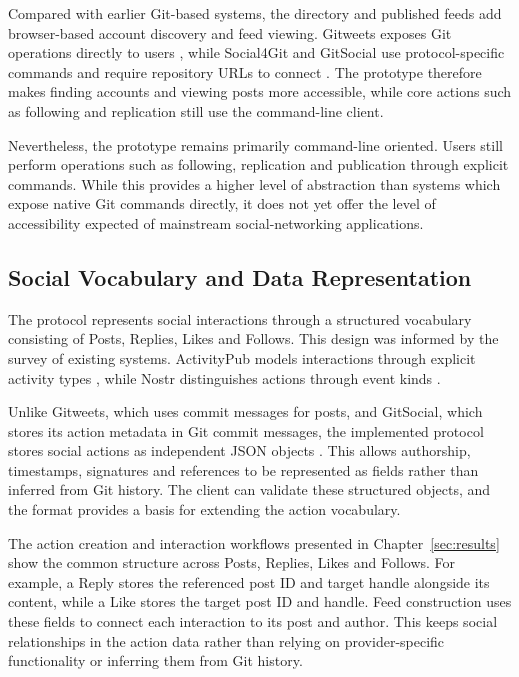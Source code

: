 Compared with earlier Git-based systems, the directory and published feeds
add browser-based account discovery and feed viewing. Gitweets exposes Git
operations directly to users \cite{gitweets2026}, while Social4Git and
GitSocial use protocol-specific commands and require repository URLs to
connect \cite{social4git2026,gitsocial2026}. The prototype therefore makes
finding accounts and viewing posts more accessible, while core actions such
as following and replication still use the command-line client.

Nevertheless, the prototype remains primarily command-line oriented.
Users still perform operations such as following, replication and
publication through explicit commands. While this provides a higher
level of abstraction than systems which expose native Git commands
directly, it does not yet offer the level of accessibility expected of
mainstream social-networking applications.

\subsection{Social Vocabulary and Data Representation}\label{sec:social-vocabulary-data}

The protocol represents social interactions through a structured
vocabulary consisting of Posts, Replies, Likes and Follows. This design
was informed by the survey of existing systems. ActivityPub models
interactions through explicit activity types \cite{w3cActivityPub2018},
while Nostr distinguishes actions through event kinds \cite{fiatjaf2026}.

Unlike Gitweets, which uses commit messages for posts, and GitSocial, which
stores its action metadata in Git commit messages, the implemented protocol
stores social actions as independent JSON objects
\cite{gitweets2026,gitsocial2026}. This allows authorship, timestamps,
signatures and references to be represented as fields rather than inferred
from Git history. The client can validate these structured objects, and the
format provides a basis for extending the action vocabulary.

The action creation and interaction workflows presented in
Chapter~\ref{sec:results} show the common structure across Posts, Replies,
Likes and Follows. For example, a Reply stores the referenced post ID and
target handle alongside its content, while a Like stores the target post ID
and handle. Feed construction uses these fields to connect each interaction
to its post and author. This keeps social relationships in the action data
rather than relying on provider-specific functionality or inferring them
from Git history.

